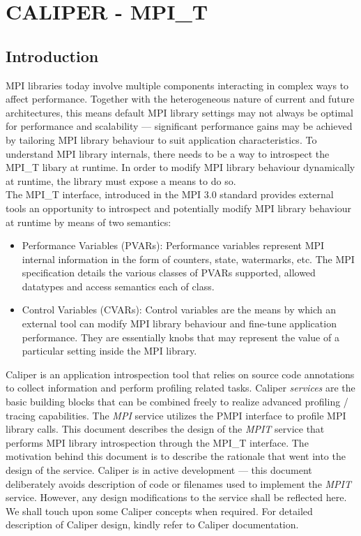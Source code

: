 \chapter{CALIPER - MPI\_T}

\section{Introduction}
MPI libraries today involve multiple components interacting in complex ways to affect performance. Together with the heterogeneous nature of current and future architectures, this means default MPI library settings may not always be optimal for performance and scalability --- significant performance gains may be achieved by tailoring MPI library behaviour to suit application characteristics. To understand MPI library internals, there needs to be a way to introspect the MPI\_T libary at runtime. In order to modify MPI library behaviour dynamically at runtime, the library must expose a means to do so. \\
The MPI\_T interface, introduced in the MPI 3.0 standard provides external tools an opportunity to introspect and potentially modify MPI library behaviour at runtime by means of two semantics:
\begin{itemize}
	\item Performance Variables (PVARs): Performance variables represent MPI internal information in the form of counters, state, watermarks, etc. The MPI specification details the various classes of PVARs supported, allowed datatypes and access semantics each of class. 
	\item Control Variables (CVARs): Control variables are the means by which an external tool can modify MPI library behaviour and fine-tune application performance. They are essentially knobs that may represent the value of a particular setting inside the MPI library.
\end{itemize}
Caliper is an application introspection tool that relies on source code annotations to collect information and perform profiling related tasks. Caliper \emph{services} are the basic building blocks that can be combined freely to realize advanced profiling / tracing capabilities. The \emph{MPI} service utilizes the PMPI interface to profile MPI library calls. This document describes the design of the \emph{MPIT} service that performs MPI library introspection through the MPI\_T interface. The motivation behind this document is to describe the rationale that went into the design of the service. Caliper is in active development --- this document deliberately avoids description of code or filenames used to implement the \emph{MPIT} service. However, any design modifications to the service shall be reflected here.\\
We shall touch upon some Caliper concepts when required. For detailed description of Caliper design, kindly refer to Caliper documentation.

